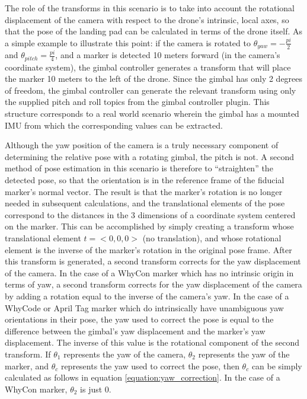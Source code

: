 The role of the transforms in this scenario is to take into account the rotational displacement of the camera with respect to the drone's intrinsic, local axes, so that the pose of the landing pad can be calculated in terms of the drone itself. As a simple example to illustrate this point: if the camera is rotated to $\theta_{yaw}=-\frac{pi}{2}$ and $\theta_{pitch}=\frac{pi}{4}$, and a marker is detected 10 meters forward (in the camera's coordinate system), the gimbal controller generates a transform that will place the marker 10 meters to the left of the drone. Since the gimbal has only 2 degrees of freedom, the gimbal controller can generate the relevant transform using only the supplied pitch and roll topics from the gimbal controller plugin. This structure corresponds to a real world scenario wherein the gimbal has a mounted \gls{IMU} from which the corresponding values can be extracted.

Although the yaw position of the camera is a truly necessary component of determining the relative pose with a rotating gimbal, the pitch is not. A second method of pose estimation in this scenario is therefore to ``straighten'' the detected pose, so that the orientation is in the reference frame of the fiducial marker's normal vector. The result is that the marker's rotation is no longer needed in subsequent calculations, and the translational elements of the pose correspond to the distances in the 3 dimensions of a coordinate system centered on the marker. This can be accomplished by simply creating a transform whose translational element $t = <0, 0, 0>$ (no translation), and whose rotational element is the inverse of the marker's rotation in the original pose frame. After this transform is generated, a second transform corrects for the yaw displacement of the camera. In the case of a WhyCon marker which has no intrinsic origin in terms of yaw, a second transform corrects for the yaw displacement of the camera by adding a rotation equal to the inverse of the camera's yaw. In the case of a WhyCode or April Tag marker which do intrinsically have unambiguous yaw orientations in their pose, the yaw used to correct the pose is equal to the difference between the gimbal's yaw displacement and the marker's yaw displacement. The inverse of this value is the rotational component of the second transform. If $\theta_1$ represents the yaw of the camera, $\theta_2$ represents the yaw of the marker, and $\theta_c$ represents the yaw used to correct the pose, then $\theta_c$ can be simply calculated as follows in equation \ref{equation:yaw_correction}. In the case of a WhyCon marker, $\theta_2$ is just 0.

